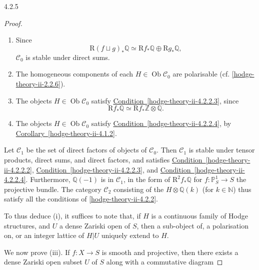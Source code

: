 \begin{proposition}{4.2.5}
\begin{proof}
\begin{enumerate}
        
        
 \item[(b)]
          Since
          \[             \mathrm {R}(f\sqcup  g)_*\mathbb {Q}             \simeq  \mathrm {R} f_*\mathbb {Q}\oplus \mathrm {R} g_*\mathbb {Q},           \]
          \(\mathcal {C}_0\) is stable under direct sums.
        


        
 \item[(c)]
          
          The homogeneous components of each \(H\in \operatorname {Ob}\mathcal {C}_0\) are polarisable (cf. \cref{hodge-theory-ii-2.2.6}).
        


        
 \item[(d)]
          The objects \(H\in \operatorname {Ob}\mathcal {C}_0\) satisfy \hyperref[hodge-theory-ii-4.2.2.3]{Condition~\ref*{hodge-theory-ii-4.2.2.3}}, since
          \[             \mathrm {R} f_*\mathbb {Q}             \simeq  \mathrm {R} f_*\mathbb {Z}\otimes \mathbb {Q}.           \]
        


        
 \item[(e)]
          The objects \(H\in \operatorname {Ob}\mathcal {C}_0\) satisfy \hyperref[hodge-theory-ii-4.2.2.4]{Condition~\ref*{hodge-theory-ii-4.2.2.4}}, by \hyperref[hodge-theory-ii-4.1.2]{Corollary~\ref*{hodge-theory-ii-4.1.2}}.
        

      \end{enumerate}\par{}Let \(\mathcal {C}_1\) be the set of direct factors of objects of \(\mathcal {C}_0\).
      Then \(\mathcal {C}_1\) is stable under tensor products, direct sums, and direct factors, and satisfies \hyperref[hodge-theory-ii-4.2.2.2]{Condition~\ref*{hodge-theory-ii-4.2.2.2}}, \hyperref[hodge-theory-ii-4.2.2.3]{Condition~\ref*{hodge-theory-ii-4.2.2.3}}, and \hyperref[hodge-theory-ii-4.2.2.4]{Condition~\ref*{hodge-theory-ii-4.2.2.4}}.
      Furthermore, \(\mathbb {Q}(-1)\) is in \(\mathcal {C}_1\), in the form of \(\mathrm {R}^2 f_*\mathbb {Q}\) for \(f\colon \mathbb {P}_S^1\to  S\) the projective bundle.
      The category \(\mathcal {C}_2\) consisting of the \(H\otimes \mathbb {Q}(k)\) (for \(k\in \mathbb {N}\)) thus satisfy all the conditions of \cref{hodge-theory-ii-4.2.2}.\par{}To thus deduce (i), it suffices to note that, if \(H\) is a continuous family of Hodge structures, and \(U\) a dense Zariski open of \(S\), then a sub-object of, a polarisation on, or an integer lattice of \(H|U\) uniquely extend to \(H\).\par{}We now prove (iii).
      If \(f\colon  X\to  S\) is smooth and projective, then there exists a dense Zariski open subset \(U\) of \(S\) along with a commutative diagram
      

\end{proof}
\end{proposition}
